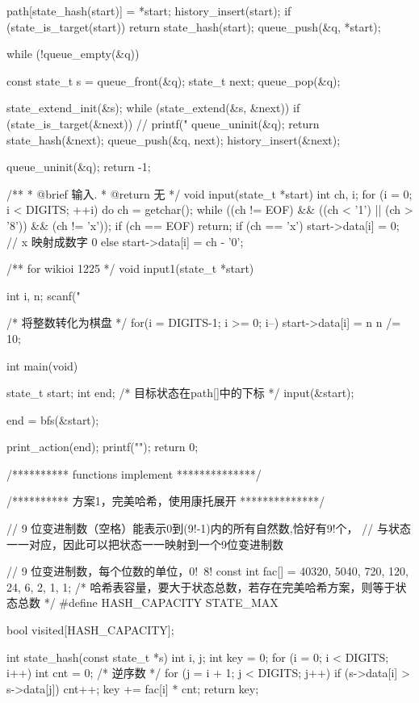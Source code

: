 \begin{Codex}[label=eight_digits_bfs.c]
{    path[state_hash(start)] = *start;
    history_insert(start);
    if (state_is_target(start))
        return state_hash(start);
    queue_push(&q, *start);

    while (!queue_empty(&q)) {
        const state_t s = queue_front(&q);
        state_t next;
        queue_pop(&q);

        state_extend_init(&s);
        while (state_extend(&s, &next)) {
            if (state_is_target(&next)) {
                // printf("%
                queue_uninit(&q);
                return state_hash(&next);
            }
            queue_push(&q, next);
            history_insert(&next);
        }
    }
    queue_uninit(&q);
    return -1;
}

/**
 * @brief 输入.
 * @return 无
 */
void input(state_t *start) {
    int ch, i;
    for (i = 0; i < DIGITS; ++i) {
        do {
            ch = getchar();
        } while ((ch != EOF) && ((ch < '1') || (ch > '8')) && (ch != 'x'));
        if (ch == EOF) return;
        if (ch == 'x') start->data[i] = 0; // x 映射成数字 0
        else           start->data[i] = ch - '0';
    }
}

/** for wikioi 1225 */
void input1(state_t *start) {
    int i, n;
    scanf("%

    /* 将整数转化为棋盘 */
    for(i = DIGITS-1; i >= 0; i--) {
        start->data[i] = n %
        n /= 10;
    }
}

int main(void) {
    state_t start;
    int end; /* 目标状态在path[]中的下标 */
    input(&start);

    end = bfs(&start);

    print_action(end);
    printf("\n");
    return 0;
}

/********** functions implement **************/

/********** 方案1，完美哈希，使用康托展开 **************/

// 9 位变进制数（空格）能表示0到(9!-1)内的所有自然数,恰好有9!个，
// 与状态一一对应，因此可以把状态一一映射到一个9位变进制数

// 9 位变进制数，每个位数的单位，0!~8!
const int fac[] = {40320, 5040, 720, 120, 24, 6, 2, 1, 1};
/* 哈希表容量，要大于状态总数，若存在完美哈希方案，则等于状态总数 */
#define HASH_CAPACITY STATE_MAX

bool visited[HASH_CAPACITY];

int state_hash(const state_t *s) {
    int i, j;
    int key = 0;
    for (i = 0; i < DIGITS; i++) {
        int cnt = 0;  /* 逆序数 */
        for (j = i + 1; j < DIGITS; j++) if (s->data[i] > s->data[j]) cnt++;
        key += fac[i] * cnt;
    }
    return key;
}


\end{Codex}
